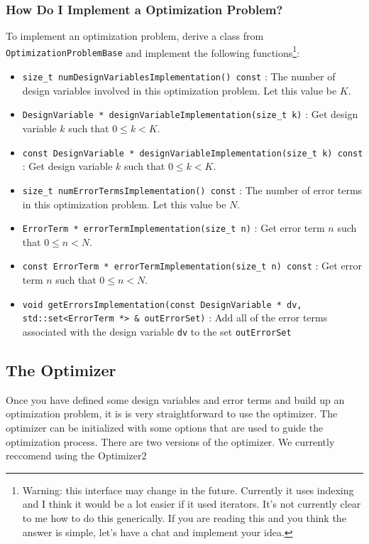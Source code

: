 \documentclass[11pt,a4,oneside]{article}
\newcommand{\txt}[1]{{\footnotesize\texttt{#1}}}
\newcommand{\listcpp}[2]{}
\begin{document}
\subsubsection{How Do I Implement a Optimization Problem?}
To implement an optimization problem, derive a class from \txt{OptimizationProblemBase} and implement the following functions\footnote{Warning: this interface may change in the future. Currently it uses indexing and I think it would be a lot easier if it used iterators. It's not currently clear to me how to do this generically. If you are reading this and you think the answer is simple, let's have a chat and implement your idea.}:
\begin{itemize}
      \item \txt{size\_t numDesignVariablesImplementation() const} : The number of design variables involved in this optimization problem. Let this value be $K$.
      \item \txt{DesignVariable * designVariableImplementation(size\_t k)} : Get design variable $k$ such that $0 \le k < K$.
      \item \txt{const DesignVariable * designVariableImplementation(size\_t k) const} : Get design variable $k$ such that $0 \le k < K$.
      \item \txt{size\_t numErrorTermsImplementation() const} : The number of error terms in this optimization problem. Let this value be $N$.
      \item \txt{ErrorTerm * errorTermImplementation(size\_t n)} : Get error term $n$ such that $0 \le n < N$.
      \item \txt{const ErrorTerm * errorTermImplementation(size\_t n) const} : Get error term $n$ such that $0 \le n < N$.
      \item \txt{void getErrorsImplementation(const DesignVariable * dv, std::set<ErrorTerm *> \& outErrorSet)} : Add all of the error terms associated with the design variable \txt{dv} to the set \txt{outErrorSet}
\end{itemize}

\subsection{The Optimizer \label{ss:Optimizer}}
Once you have defined some design variables and error terms and build up an optimization problem, it is is very straightforward to use the optimizer. The optimizer can be initialized with some options that are used to guide the optimization process. There are two versions of the optimizer. We currently reccomend using the Optimizer2
\listcpp{Optimizer2Options.hpp}{../../aslam_backend/include/aslam/backend/Optimizer2Options.hpp}
\end{document}
